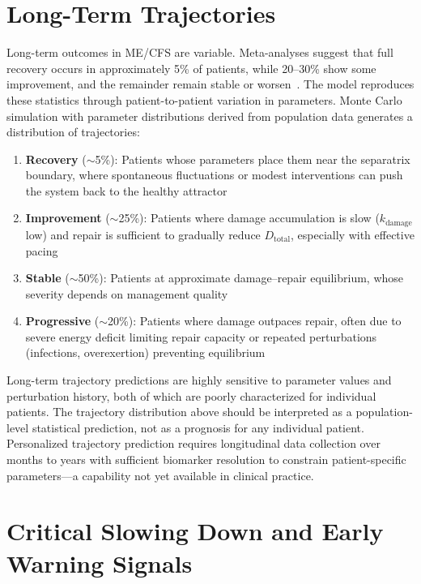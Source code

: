 \section{Long-Term Trajectories}
\label{sec:long-term-trajectories}

Long-term outcomes in ME/CFS are variable. Meta-analyses suggest that full recovery occurs in approximately 5\% of patients, while 20--30\% show some improvement, and the remainder remain stable or worsen~\cite{Brurberg2014}. The model reproduces these statistics through patient-to-patient variation in parameters. Monte Carlo simulation with parameter distributions derived from population data generates a distribution of trajectories:

\begin{enumerate}
    \item \textbf{Recovery} ($\sim$5\%): Patients whose parameters place them near the separatrix boundary, where spontaneous fluctuations or modest interventions can push the system back to the healthy attractor
    \item \textbf{Improvement} ($\sim$25\%): Patients where damage accumulation is slow ($k_{\text{damage}}$ low) and repair is sufficient to gradually reduce $D_{\text{total}}$, especially with effective pacing
    \item \textbf{Stable} ($\sim$50\%): Patients at approximate damage--repair equilibrium, whose severity depends on management quality
    \item \textbf{Progressive} ($\sim$20\%): Patients where damage outpaces repair, often due to severe energy deficit limiting repair capacity or repeated perturbations (infections, overexertion) preventing equilibrium
\end{enumerate}

\begin{limitation}
Long-term trajectory predictions are highly sensitive to parameter values and perturbation history, both of which are poorly characterized for individual patients. The trajectory distribution above should be interpreted as a population-level statistical prediction, not as a prognosis for any individual patient. Personalized trajectory prediction requires longitudinal data collection over months to years with sufficient biomarker resolution to constrain patient-specific parameters---a capability not yet available in clinical practice.
\end{limitation}

\section{Critical Slowing Down and Early Warning Signals}
\label{sec:critical-slowing-down}

